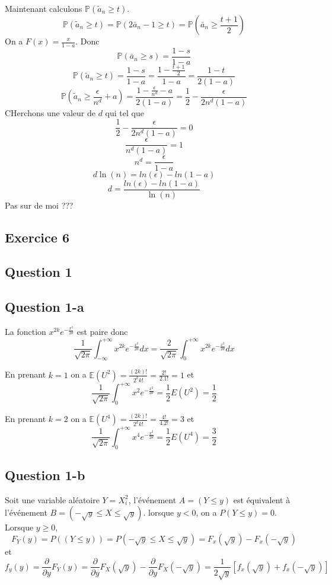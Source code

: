 \documentclass[]{book}
\theoremstyle{definition}
\begin{document}
Maintenant calculons $\mathbb{P}(\tilde{a}_n \geq t)$.
$$
\mathbb{P}(\tilde{a}_n \geq t) = \mathbb{P}(2\bar{a}_n - 1 \geq t) = \mathbb{P}\left(\bar{a}_n \geq \frac{t +1}{2}\right)
$$
On a $F(x) = \frac{x}{1-a}$.
Donc 
$$
\mathbb{P}(\bar{a}_n \geq s) = \frac{1-s}{1-a}
$$
$$
\mathbb{P}(\tilde{a}_n \geq t) = \frac{1-s}{1-a} = \frac{1-\frac{t +1}{2}}{1-a} = \frac{1-t}{2(1-a)}
$$
$$
\mathbb{P}(\tilde{a}_n \geq \frac{\epsilon}{n^d} + a) = \frac{1-\frac{\epsilon}{n^d} - a}{2(1-a)} = \frac{1}{2}-\frac{\epsilon}{2n^d(1-a)}
$$
CHerchons une valeur de $d$ qui tel que
$$
\frac{1}{2}-\frac{\epsilon}{2n^d(1-a)} = 0
$$
$$
\frac{\epsilon}{n^d(1-a)} = 1
$$
$$
n^d = \frac{\epsilon}{1-a}
$$
$$
d\ln(n) = ln(\epsilon) - ln(1-a)
$$
$$
d= \frac{ln(\epsilon) - ln(1-a)}{\ln(n)}
$$
Pas sur de moi ???

\subsection*{Exercice 6}
\subsection*{Question 1}
\subsection*{Question 1-a}

La fonction $x^{2k}e^{-\frac{x^2}{2\theta}}$ est paire donc 
$$
\frac{1}{\sqrt{2\pi}} \int_{-\infty}^{+\infty} x^{2k}e^{-\frac{x^2}{2\theta}} dx = \frac{2}{\sqrt{2\pi}} \int_{0}^{+\infty} x^{2k}e^{-\frac{x^2}{2\theta}} dx
$$

En prenant $k=1$ on a $\mathbb{E}(U^{2}) = \frac{(2k)!}{2^kk!} = \frac{2!}{2.1!} = 1$ et 
$$
\frac{1}{\sqrt{2\pi}} \int_{0}^{+\infty} x^{2}e^{-\frac{x^2}{2\theta}} = \frac{1}{2} E(U^2) = \frac{1}{2}
$$

En prenant $k=2$ on a $\mathbb{E}(U^{4}) = \frac{(2k)!}{2^kk!} = \frac{4!}{4.2!} = 3$ et
$$
\frac{1}{\sqrt{2\pi}} \int_{0}^{+\infty} x^{4}e^{-\frac{x^2}{2\theta}} = \frac{1}{2} E(U^4) = \frac{3}{2}
$$


\subsection*{Question 1-b}
Soit une variable al\'eatoire $Y = X_i^2$, l'\'ev\'enement $A = (Y \leq y)$ est \'equivalent \`a l'\'ev\'enement $B = (-\sqrt{y} \leq X \leq \sqrt{y})$. lorsque $y < 0$, on a $P(Y \leq y)=0$.
Lorsque $y \geq 0$,
$$
F_{Y}(y) = P( (Y \leq y)) = P (-\sqrt{y} \leq X \leq \sqrt{y}) = F_{x}(\sqrt{y}) - F_{x}(-\sqrt{y})
$$
et
$$
f_{y}(y) = \frac{\partial}{\partial y} F_{Y}(y) = \frac{\partial}{\partial y} F_{X}(\sqrt{y}) - \frac{\partial}{\partial y} F_{X}(-\sqrt{y}) = \frac{1}{2\sqrt{y}}[f_{x}(\sqrt{y}) + f_{x}(-\sqrt{y})]
$$
\end{document}
